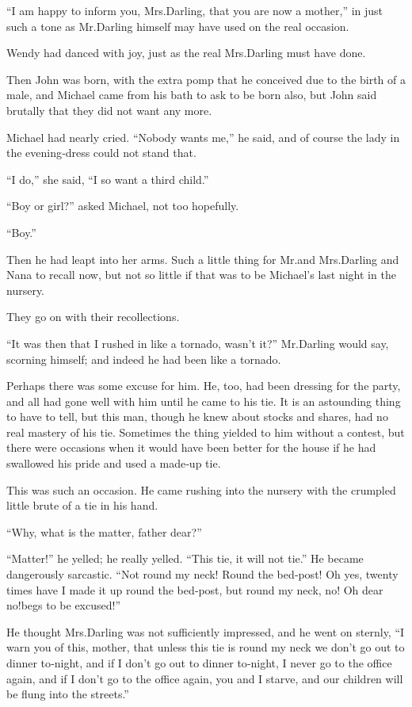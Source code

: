 “I am happy to inform you, Mrs.\@ Darling, that you are now a mother,”
in just such a tone as Mr.\@ Darling himself may have used on the real occasion.

Wendy had danced with joy, just as the real Mrs.\@ Darling must have done.

Then John was born, with the extra pomp that he conceived due to the birth of a male,
and Michael came from his bath to ask to be born also,
but John said brutally that they did not want any more.

Michael had nearly cried.
“Nobody wants me,” he said,
and of course the lady in the evening‐dress could not stand that.

“I do,” she said, “I so want a third child.”

“Boy or girl?\@” asked Michael, not too hopefully.

“Boy.”

Then he had leapt into her arms.
Such a little thing for Mr.\@ and Mrs.\@ Darling and Nana to recall now,
but not so little if that was to be Michael’s last night in the nursery.

They go on with their recollections.

“It was then that I rushed in like a tornado, wasn’t it?\@” Mr.\@ Darling would say, scorning himself;
and indeed he had been like a tornado.

Perhaps there was some excuse for him.
He, too, had been dressing for the party,
and all had gone well with him until he came to his tie.
It is an astounding thing to have to tell,
but this man, though he knew about stocks and shares, had no real mastery of his tie.
Sometimes the thing yielded to him without a contest,
but there were occasions when it would have been better for the house
if he had swallowed his pride and used a made‐up tie.

This was such an occasion.
He came rushing into the nursery with the crumpled little brute of a tie in his hand.

“Why, what is the matter, father dear?”

“Matter!\@” he yelled;
he really yelled.
“This tie, it will not tie.”
He became dangerously sarcastic.
“Not round my neck!
Round the bed‐post!
Oh yes, twenty times have I made it up round the bed‐post, but round my neck, no!
Oh dear no!\@ begs to be excused!”

He thought Mrs.\@ Darling was not sufficiently impressed, and he went on sternly,
“I warn you of this, mother, that unless this tie is round my neck we don’t go out to dinner to‐night,
and if I don’t go out to dinner to‐night, I never go to the office again,
and if I don’t go to the office again,
you and I starve, and our children will be flung into the streets.”

